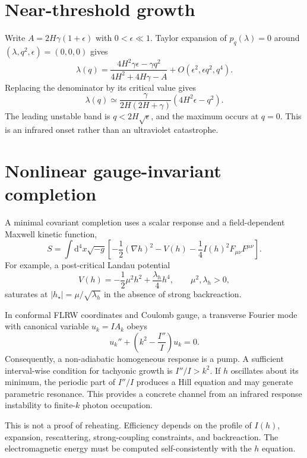 \documentclass[11pt]{article}
\newcommand{\dd}{\mathrm{d}}
\begin{document}
\section{Near-threshold growth}

Write $A=2H\gamma(1+\epsilon)$ with $0<\epsilon\ll1$.  Taylor expansion of $p_q(\lambda)=0$ around $(\lambda,q^2,\epsilon)=(0,0,0)$ gives
\[
\lambda(q)=\frac{4H^2\gamma\epsilon-\gamma q^2}
{4H^2+4H\gamma-A}+O(\epsilon^2,\epsilon q^2,q^4).
\]
Replacing the denominator by its critical value gives
\begin{equation}
\lambda(q)\simeq\frac{\gamma}{2H(2H+\gamma)}(4H^2\epsilon-q^2).
\end{equation}
The leading unstable band is $q<2H\sqrt\epsilon$, and the maximum occurs at $q=0$.  This is an infrared onset rather than an ultraviolet catastrophe.

\section{Nonlinear gauge-invariant completion}

A minimal covariant completion uses a scalar response and a field-dependent Maxwell kinetic function,
\begin{equation}
S=\int \dd^4x\sqrt{-g}\left[-\frac12(\nabla h)^2-V(h)-\frac14 I(h)^2F_{\mu\nu}F^{\mu\nu}\right].
\end{equation}
For example, a post-critical Landau potential
\[
V(h)=-\frac12\mu^2h^2+\frac{\lambda_h}{4}h^4,
\qquad \mu^2,\lambda_h>0,
\]
saturates at $|h_\star|=\mu/\sqrt{\lambda_h}$ in the absence of strong backreaction.

In conformal FLRW coordinates and Coulomb gauge, a transverse Fourier mode with canonical variable $u_k=I A_k$ obeys
\begin{equation}\label{eq:pump}
u_k''+\left(k^2-\frac{I''}{I}\right)u_k=0.
\end{equation}
Consequently, a non-adiabatic homogeneous response is a pump.  A sufficient interval-wise condition for tachyonic growth is $I''/I>k^2$.  If $h$ oscillates about its minimum, the periodic part of $I''/I$ produces a Hill equation and may generate parametric resonance.  This provides a concrete channel from an infrared response instability to finite-$k$ photon occupation.

This is not a proof of reheating.  Efficiency depends on the profile of $I(h)$, expansion, rescattering, strong-coupling constraints, and backreaction.  The electromagnetic energy must be computed self-consistently with the $h$ equation.
\end{document}
